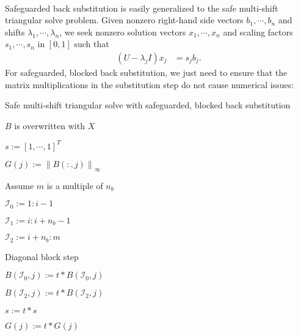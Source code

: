 \documentclass{article}
\begin{document}
\paragraph{} Safeguarded back substitution is easily generalized to
the safe multi-shift triangular solve problem. Given nonzero
right-hand side vectors \(b_1,\cdots,b_n\) and shifts
\(\lambda_1,\cdots,\lambda_n\), we seek nonzero solution vectors
\(x_1,\cdots,x_n\) and scaling factors \(s_1,\cdots,s_n\) in
\(\left[0,1\right]\) such that
\begin{align}
  \left( U - \lambda_j I\right) x_j &= s_j b_j.
\end{align}
For safeguarded, blocked back substitution, we just need to ensure
that the matrix multiplications in the substitution step do not cause
numerical issues:
\begin{algorithm}[H]
  \label{algorithm:safe multi-shift trsm}
  \caption{Safe multi-shift triangular solve with safeguarded, blocked back substitution }
  \begin{algorithmic}
    \Comment \(B\) is overwritten with \(X\)

    \State \(s := \left[1, \cdots, 1 \right]^T\)


    \State \( G(j) := \left\lVert B(:,j) \right\rVert_\infty\)

    \EndFor

     \Comment Assume \(m\) is a multiple of
    \(n_b\)

    \State \( \mathcal{I}_0 := 1:i-1 \)

    \State \( \mathcal{I}_1 := i:i+n_b-1\)

    \State \( \mathcal{I}_2 := i+n_b:m\)
    

    \State {} 
    \Comment Diagonal block step


    \State \(B(\mathcal{I}_0,j) := t*B(\mathcal{I}_0,j)\)

    \State \(B(\mathcal{I}_2,j) := t*B(\mathcal{I}_2,j)\)

    \State \(s := t * s\)

    \State \(G(j) := t * G(j)\)

    \EndIf

    \EndFor


\end{algorithmic}
\end{algorithm}
\end{document}
